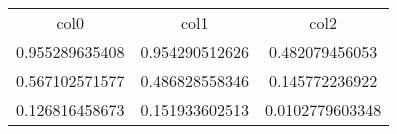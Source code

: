 \begin{table}
\begin{tabular}{ccc}
col0 & col1 & col2 \\
0.955289635408 & 0.954290512626 & 0.482079456053 \\
0.567102571577 & 0.486828558346 & 0.145772236922 \\
0.126816458673 & 0.151933602513 & 0.0102779603348 \\
\end{tabular}
\end{table}
